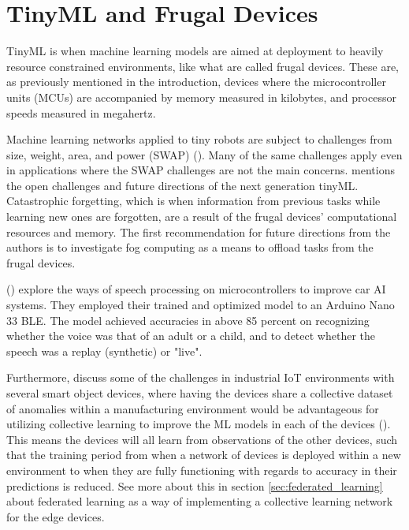 \section{TinyML and Frugal Devices}
\label{app:tinyML}
TinyML is when machine learning models are aimed at deployment to heavily resource constrained environments, like what are called frugal devices. These are, as previously mentioned in the introduction, devices where the microcontroller units (MCUs) are accompanied by memory measured in kilobytes, and processor speeds measured in megahertz. 

Machine learning networks applied to tiny robots are subject to challenges from size, weight, area, and power (SWAP) (\cite{ne2022robotstinymlconstraints}). Many of the same challenges apply even in applications where the SWAP challenges are not the main concerns. \citeauthor{ra2023reformabletinyml} mentions the open challenges and future directions of the next generation tinyML. Catastrophic forgetting, which is when information from previous tasks while learning new ones are forgotten, are a result of the frugal devices' computational resources and memory. The first recommendation for future directions from the authors is to investigate fog computing as a means to offload tasks from the frugal devices.

\citeauthor{ma2023tinyML_speech_recognition} (\citeyear{ma2023tinyML_speech_recognition}) explore the ways of speech processing on microcontrollers to improve car AI systems. They employed their trained and optimized model to an Arduino Nano 33 BLE. The model achieved accuracies in above 85 percent on recognizing whether the voice was that of an adult or a child, and to detect whether the speech was a replay (synthetic) or "live". 

Furthermore, \citeauthor{ra2023reformabletinyml} discuss some of the challenges in industrial IoT environments with several smart object devices, where having the devices share a collective dataset of anomalies within a manufacturing environment would be advantageous for utilizing collective learning to improve the ML models in each of the devices (\citeyear{ra2023reformabletinyml}). This means the devices will all learn from observations of the other devices, such that the training period from when a network of devices is deployed within a new environment to when they are fully functioning with regards to accuracy in their predictions is reduced. See more about this in section \ref{sec:federated_learning} about federated learning as a way of implementing a collective learning network for the edge devices.
